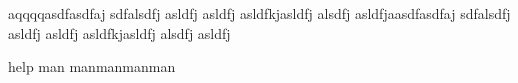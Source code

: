 aqqqqasdfasdfaj sdfalsdfj asldfj asldfj asldfkjasldfj alsdfj asldfjaasdfasdfaj sdfalsdfj asldfj asldfj asldfkjasldfj alsdfj asldfj


help man manmanmanman
